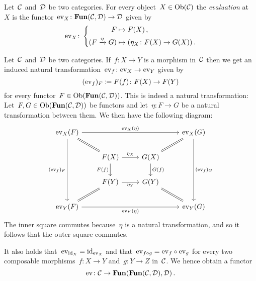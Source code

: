 \begin{definition}
  Let~$\mathcal{C}$ and~$\mathcal{D}$ be two categories.
  For every object~$X \in \operatorname{Ob}(\mathcal{C})$ the \emph{evaluation} at~$X$ is the functor~$\mathrm{ev}_X \colon \mathbf{Fun}(\mathcal{C}, \mathcal{D}) \to \mathcal{D}$ given by
  \[
            \mathrm{ev}_X
    \colon  \left\{
              \begin{aligned}
                          F
                &\mapsto  F(X) \,,
                \\
                          (F \xrightarrow{\eta} G)
                &\mapsto  (\eta_X \colon F(X) \to G(X)) \,.
              \end{aligned}
            \right.
  \]
\end{definition}


\begin{remark}
  Let~$\mathcal{C}$ and~$\mathcal{D}$ be two categories.
  If~$f \colon X \to Y$ is a morphism in~$\mathcal{C}$ then we get an induced natural transformation~$\mathrm{ev}_f \colon \mathrm{ev}_X \to \mathrm{ev}_Y$ given by
  \[
              (\mathrm{ev}_f)_F
    \coloneqq  F(f)
    \colon    F(X)
    \to       F(Y)
  \]
  for every functor~$F \in \operatorname{Ob}(\mathbf{Fun}(\mathcal{C}, \mathcal{D}))$.
  This is indeed a natural transformation:
  Let~$F, G \in \operatorname{Ob}(\mathbf{Fun}(\mathcal{C}, \mathcal{D}))$ be functors and let~$\eta \colon F \to G$ be a natural transformation between them.
  We then have the following diagram:
  \[
    \begin{tikzcd}
        \ev_X(F)
        \arrow{rrr}[above]{\ev_X(\eta)}
        \arrow{ddd}[left]{(\ev_f)_F}
        \arrow[equal]{dr}
      & {}
      & {}
      & \ev_X(G)
        \arrow{ddd}[right]{(\ev_f)_G}
        \arrow[equal]{dl}
      \\
        {}
      & F(X)
        \arrow{r}[above]{\eta_X}
        \arrow{d}[left]{F(f)}
      & G(X)
        \arrow{d}[right]{G(f)}
      & {}
      \\
        {}
      & F(Y)
        \arrow{r}[below]{\eta_Y}
      & G(Y)
      & {}
      \\
        \ev_Y(F)
        \arrow{rrr}[below]{\ev_Y(\eta)}
        \arrow[equal]{ur}
      & {}
      & {}
      & \ev_Y(G)
        \arrow[equal]{ul}
    \end{tikzcd}
  \]
  The inner square commutes because~$\eta$ is a natural transformation, and so it follows that the outer square commutes.
  
  It also holds that~$\mathrm{ev}_{\operatorname{id}_X} = \operatorname{id}_{\mathrm{ev}_X}$ and that~$\mathrm{ev}_{f \circ g} = \mathrm{ev}_f \circ \mathrm{ev}_g$ for every two composable morphisms~$f \colon X \to Y$ and~$g \colon Y \to Z$ in~$\mathcal{C}$.
  We hence obtain a functor
  \[
            \mathrm{ev}
    \colon  \mathcal{C}
    \to     \mathbf{Fun}( \mathbf{Fun}(\mathcal{C}, \mathcal{D}), \mathcal{D} ) \,.
  \]

\end{remark}




